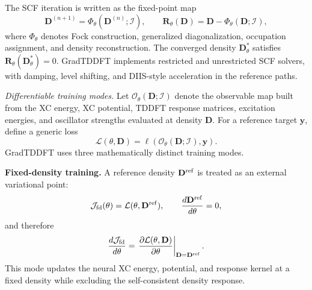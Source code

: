 The SCF iteration is written as the fixed-point map
\begin{equation}
  \mathbf{D}^{(n+1)}
  =
  \Phi_\theta(\mathbf{D}^{(n)};\mathcal{I}),
  \qquad
  \mathbf{R}_\theta(\mathbf{D})
  =
  \mathbf{D}-\Phi_\theta(\mathbf{D};\mathcal{I}),
  \label{eq:scf-fixed-point}
\end{equation}
where $\Phi_\theta$ denotes Fock construction, generalized
diagonalization, occupation assignment, and density reconstruction.
The converged density $\mathbf{D}^{*}_\theta$ satisfies
$\mathbf{R}_\theta(\mathbf{D}^{*}_\theta)=0$. GradTDDFT implements
restricted and unrestricted SCF solvers, with damping, level shifting,
and DIIS-style acceleration in the reference paths.\cite{DIIS}

\emph{Differentiable training modes.} Let
$\mathcal{O}_{\theta}(\mathbf{D};\mathcal{I})$ denote the
observable map built from the XC energy, XC potential, TDDFT
response matrices, excitation energies, and oscillator strengths
evaluated at density
$\mathbf{D}$. For a reference target $\mathbf{y}$, define a generic
loss
\begin{equation}
  \mathcal{L}(\theta,\mathbf{D})
  =
  \ell\!\left(
    \mathcal{O}_{\theta}(\mathbf{D};\mathcal{I}),\mathbf{y}
  \right).
  \label{eq:generic-loss}
\end{equation}
GradTDDFT uses three mathematically distinct training modes.

\textbf{Fixed-density training.} A reference density
$\mathbf{D}^{\rm ref}$ is treated as an external variational point:
\begin{equation}
  \mathcal{J}_{\rm fd}(\theta)
  =
  \mathcal{L}(\theta,\mathbf{D}^{\rm ref}),
  \qquad
  \frac{d\mathbf{D}^{\rm ref}}{d\theta}=0,
  \label{eq:fd-objective}
\end{equation}
and therefore
\begin{equation}
  \frac{d\mathcal{J}_{\rm fd}}{d\theta}
  =
  \left.
  \frac{\partial \mathcal{L}(\theta,\mathbf{D})}
       {\partial\theta}
  \right|_{\mathbf{D}=\mathbf{D}^{\rm ref}} .
  \label{eq:fd-gradient}
\end{equation}
This mode updates the neural XC energy, potential, and response
kernel at a fixed density while excluding the self-consistent density
response.

